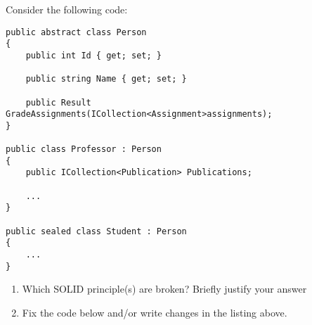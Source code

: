 Consider the following code:
\begin{lstlisting}
public abstract class Person
{
    public int Id { get; set; }

    public string Name { get; set; }

    public Result GradeAssignments(ICollection<Assignment>assignments);
}

public class Professor : Person
{
    public ICollection<Publication> Publications;

    ...
}

public sealed class Student : Person
{
    ...
}
\end{lstlisting}

\begin{enumerate}
    \item {} Which SOLID principle(s) are broken? Briefly justify your answer
        \newline\answer\questionSixAnswerA
    \item {} Fix the code below and/or write changes in the listing above.
        
\end{enumerate}